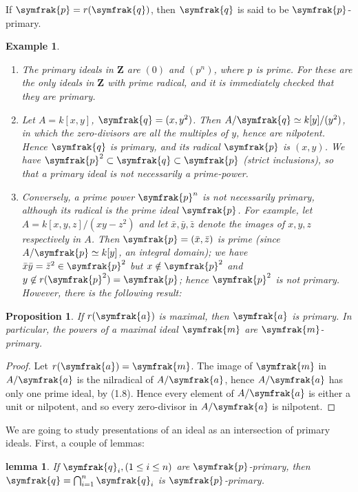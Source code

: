 \documentclass{standalone}
\newtheorem{proposition}[theorem]{Proposition}
\newtheorem{lemma}[theorem]{lemma}
\newtheorem*{example}{Example}
\theoremstyle{definition}
\theoremstyle{remark}
\begin{document}
If $\symfrak{p}=r(\symfrak{q})$, then $\symfrak{q}$ is said to be
$\symfrak{p}$-primary.
\begin{example}
\begin{enumerate}
\item The primary ideals in $\mathbf{Z}$ are $(0)$ and $(p^n)$, where $p$ is
  prime. For these are the only ideals in $\mathbf{Z}$ with prime radical, and
  it is immediately checked that they are primary.
\item Let $A=k[x,y]$, $\symfrak{q} = (x, y^2)$. Then $A/\symfrak{q} \simeq
  k[y]/(y^2)$, in which the zero-divisors are all the multiples of $y$, hence
  are nilpotent. Hence $\symfrak{q}$ is primary, and its radical $\symfrak{p}$
  is $(x, y)$. We have $\symfrak{p}^2\subset \symfrak{q}\subset \symfrak{p}$
  (strict inclusions), so that a primary ideal is not necessarily a prime-power.
\item Conversely, a prime power $\symfrak{p}^n$ is not necessarily primary,
  although its radical is the prime ideal $\symfrak{p}$. For example, let $A =
  k[x, y, z]/(xy - z^2)$ and let $\bar{x},\bar{y}, \bar{z}$ denote the images of
  $x, y, z$ respectively in $A$. Then $\symfrak{p} = (\bar{x}, \bar{z})$ is
  prime (since $A/\symfrak{p}\simeq k[y]$, an integral domain); we have
  $\bar{x}\bar{y} = \bar{z}^2\in \symfrak{p}^2$ but $x \notin \symfrak{p}^2$ and
  $y \not\in r(\symfrak{p}^2 ) = \symfrak{p}$; hence $\symfrak{p}^2$ is not
  primary. However, there is the following result:
\end{enumerate}
\end{example}
\begin{proposition}
  If $r(\symfrak{a})$ is maximal, then $\symfrak{a}$ is primary. In particular,
  the powers of a maximal ideal $\symfrak{m}$ are $\symfrak{m}$-primary.
\end{proposition}
\begin{proof}
  Let $r(\symfrak{a}) = \symfrak{m}$. The image of $\symfrak{m}$ in
  $A/\symfrak{a}$ is the nilradical of $A/\symfrak{a}$, hence $A/\symfrak{a}$
  has only one prime ideal, by (1.8). Hence every element of $A/\symfrak{a}$ is
  either a unit or nilpotent, and so every zero-divisor in $A/\symfrak{a}$ is
  nilpotent.
\end{proof}
We are going to study presentations of an ideal as an intersection of primary
ideals. First, a couple of lemmas:
\begin{lemma}\label{lem:4.3}
  If $\symfrak{q}_i, (1 \le i \le n)$ are $\symfrak{p}$-primary, then
  $\symfrak{q} = \bigcap_{i=1}^{n}\symfrak{q}_i$ is $\symfrak{p}$-primary.
\end{lemma}
\end{document}
